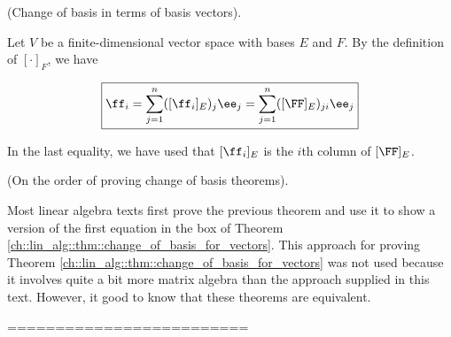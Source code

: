 \begin{theorem}
\label{ch::lin_alg::thm::change_of_basis_with_basis_vectors}
    (Change of basis in terms of basis vectors).
    
    Let $V$ be a finite-dimensional vector space with bases $E$ and $F$. By the definition of $[\cdot]_F$, we have
    
    \begin{align*}
        \boxed
        {
            \ff_i = \sum_{j = 1}^n ([\ff_i]_E)_j \ee_j = \sum_{j = 1}^n ([\FF]_E)_{ji} \ee_j
        }
    \end{align*}
    
    In the last equality, we have used that $[\ff_i]_E$ is the $i$th column of $[\FF]_E$.
\end{theorem}

\begin{remark}
    (On the order of proving change of basis theorems). 
    
    Most linear algebra texts first prove the previous theorem and use it to show a version of the first equation in the box of Theorem \ref{ch::lin_alg::thm::change_of_basis_for_vectors}. This approach for proving Theorem \ref{ch::lin_alg::thm::change_of_basis_for_vectors} was not used because it involves quite a bit more matrix algebra than the approach supplied in this text. However, it good to know that these theorems are equivalent.
\end{remark}

=========================

